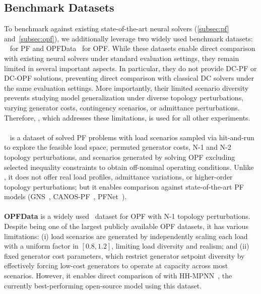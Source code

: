 \subsection{Benchmark Datasets}
\label{subsec:benchmark_data}
To benchmark \genco against existing state-of-the-art neural solvers (\cref{subsec:pf} and~\ref{subsec:opf}), we additionally leverage two widely used benchmark datasets: \pfdelta~\cite{NEURIPS2025_d000ef56} for PF and OPFData~\cite{lovett2024opfdatalargescaledatasetsac} for OPF. While these datasets enable direct comparison with existing neural solvers under standard evaluation settings, they remain limited in several important aspects. In particular, they do not provide DC-PF or DC-OPF solutions, preventing direct comparison with classical DC solvers under the same evaluation settings. More importantly, their limited scenario diversity prevents studying model generalization under diverse topology perturbations, varying generator costs, contingency scenarios, or admittance perturbations. Therefore, \datakit, which addresses these limitations, is used for all other experiments.
\\\\
\textbf{\pfdelta}~\cite{NEURIPS2025_d000ef56} is a dataset of solved PF problems with load scenarios sampled via hit-and-run to explore the feasible load space, permuted generator costs, N-1 and N-2 topology perturbations, and scenarios generated by solving OPF excluding selected inequality constraints to obtain off-nominal operating conditions. Unlike \datakit, it does not offer real load profiles, admittance variations, or higher-order topology perturbations; but it enables comparison against state-of-the-art PF models (GNS~\cite{DONON2020106547}, CANOS-PF~\cite{piloto2024}, PFNet~\cite{lin2024powerflownet}).
\\\\
\textbf{OPFData} is a widely used~\cite{arowolo2025, hedgeopf2025,piloto2024, lumina2026, yang2026gridsfm} dataset for OPF with N-1 topology perturbations. Despite being one of the largest publicly available OPF datasets, it has various limitations: (i) load scenarios are generated by independently scaling each load with a uniform factor in $[0.8, 1.2]$, limiting load diversity and realism; and (ii) fixed generator cost parameters, which restrict generator setpoint diversity by effectively forcing low-cost generators to operate at capacity across most scenarios. However, it enables direct comparison of \genco with HH-MPNN~\cite{arowolo2025}, the currently best-performing open-source model using this dataset.





